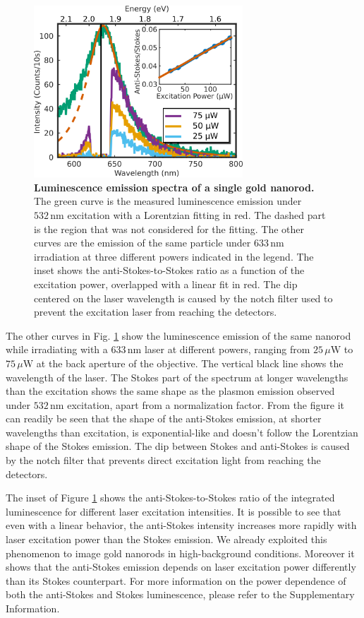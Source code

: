 \documentclass[journal=nalefd,manuscript=letter]{achemso}
\newcommand{\nm}{\ensuremath{\,\textrm{nm}}}
\newcommand{\uW}{\ensuremath{\,\mu\textrm{W}}}
\begin{document}
\begin{figure}[tp] \centering
\includegraphics[width=78.4mm]{Figures/02_Several_Intensities/02_several_intensities.png}
\caption{\textbf{Luminescence emission spectra of a single gold nanorod.} The green curve is the
measured luminescence emission under $532\nm$ excitation with a Lorentzian fitting in red. The
dashed part is the region that was not considered for the fitting. The other
curves are the emission of the same particle under $633\nm$ irradiation at three 
different powers indicated in the legend. The inset shows the anti-Stokes-to-Stokes ratio as a function
of the excitation power, overlapped with a linear fit in red. The dip centered on the laser wavelength
is caused by the notch filter used to prevent the excitation laser from reaching the detectors.}
	\label{fig:spectra_intensity}
\end{figure}

The other curves in Fig. \ref{fig:spectra_intensity} show the luminescence emission of
the same nanorod while irradiating with a $633\nm$ laser at different powers,
ranging from $25\uW$ to $75\uW$ at the back aperture of the objective.  
The vertical black line shows the wavelength of the laser. The Stokes part of the
spectrum at longer wavelengths than the excitation shows the same shape as the
plasmon emission observed under $532\nm$ excitation, apart from a normalization
factor. From the figure it can readily be seen that the shape of the anti-Stokes
emission, at shorter wavelengths than excitation, is exponential-like and
doesn't follow the Lorentzian shape of the Stokes emission. The dip between
Stokes and anti-Stokes is caused by the notch filter that prevents direct
excitation light from reaching the detectors. 

The inset of Figure \ref{fig:spectra_intensity} shows the anti-Stokes-to-Stokes ratio of
the integrated luminescence for different laser excitation intensities. It is
possible to see that even with a linear behavior, the anti-Stokes intensity
increases more rapidly with laser excitation power than the Stokes emission.
We already exploited this phenomenon to image gold nanorods in high-background
conditions\cite{Carattino2016a}. Moreover it shows that the anti-Stokes emission
depends on laser excitation power differently than its Stokes counterpart. For more 
information on the power dependence of both the anti-Stokes and Stokes luminescence, 
please refer to the Supplementary Information. 
\end{document}

